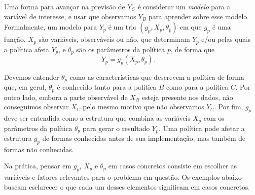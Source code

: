 \documentclass[12pt]{article}
\theoremstyle{break}
\begin{document}
Uma forma para avançar na previsão de $Y_C$ é considerar um \textit{modelo} para a variável de interesse, e usar que observamos $Y_B$ para aprender sobre esse modelo. Formalmente, um modelo para $Y_p$ é um trio $(g_p, X_p, \theta_p)$ em que $g_p$ é uma função, $X_p$ são variáveis, observáveis ou não, que determinam $Y_p$ e/ou pelas quais a política afeta $Y_p$, e $\theta_p$ são os parâmetros da política $p$, de forma que
\begin{equation}
\label{eq:model}
Y_p=g_p(X_p, \theta_p).
\end{equation}

Devemos entender $\theta_p$ como as características que descrevem a política de forma que, em geral, $\theta_p$ é conhecido tanto para a política $B$ como para a política $C$. Por outro lado, embora a parte observável de $X_B$ esteja presente nos dados, não conseguimos observar $X_C$ pelo mesmo motivo que não observamos $Y_C$. Por fim, $g_p$ deve ser entendida como a estrutura que combina as variáveis $X_p$ com os parâmetros da política $\theta_p$ para gerar o resultado $Y_p$. Uma política pode afetar a estrutura $g_p$ de formas conhecidas antes de sua implementação, mas também de formas não conhecidas. 

Na prática, pensar em $g_p$, $X_p$ e $\theta_p$ em casos concretos consiste em escolher as variáveis e fatores relevantes para o problema em questão. Os exemplos abaixo buscam esclarecer o que cada um desses elementos significam em casos concretos. 
\end{document}
